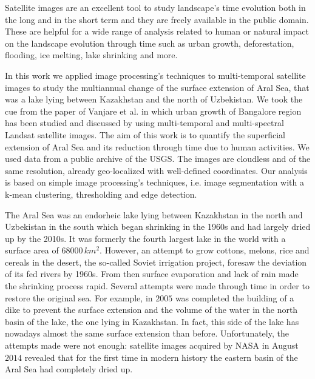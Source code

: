 Satellite images are an excellent tool to study landscape’s time evolution both in the long and in the short term and they are freely available in the public domain. 
These are helpful for a wide range of analysis related to human or natural impact on the landscape evolution through time such as urban growth, deforestation, flooding, ice melting, lake shrinking and more. 

In this work we applied image processing’s techniques to multi-temporal satellite images to study the multiannual change of the surface extension of Aral Sea, that was a lake lying between Kazakhstan and the north of Uzbekistan. 
We took the cue from the paper of Vanjare et al. \cite{satelliteImg} in which urban growth of Bangalore region has been studied and discussed by using multi-temporal and multi-spectral Landsat satellite images. 
The aim of this work is to quantify the superficial extension of Aral Sea and its reduction through time due to human activities. We used data from a public archive of the USGS. 
The images are cloudless and of the same resolution, already geo-localized with well-defined coordinates. 
Our analysis is based on simple image processing’s techniques, i.e. image segmentation with a k-mean clustering, thresholding and edge detection.   

The Aral Sea was an endorheic lake lying between Kazakhstan in the north and Uzbekistan in the south which began shrinking in the 1960s and had largely dried up by the 2010s. 
It was formerly the fourth largest lake in the world with a surface area of $68000\,km^2$.  
However, an attempt to grow cottons, melons, rice and cereals in the desert, the so-called Soviet irrigation project, foresaw the deviation of its fed rivers by 1960s. 
From then surface evaporation and lack of rain made the shrinking process rapid. Several attempts were made through time in order to restore the original sea. For example, in $2005$ was completed the building of a dike to prevent the surface extension and the volume of the water in the north basin of the lake, the one lying in Kazakhstan. 
In fact, this side of the lake has nowadays almost the same surface extension than before. 
Unfortunately, the attempts made were not enough: satellite images acquired by NASA in August $2014$ revealed that for the first time in modern history the eastern basin of the Aral Sea had completely dried up. 
